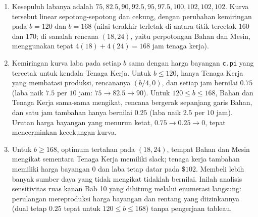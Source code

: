 \begin{enumerate}
\item Kesepuluh labanya adalah
$75, 82.5, 90, 92.5, 95, 97.5, 100, 102, 102, 102$. Kurva tersebut linear
sepotong-sepotong dan cekung, dengan perubahan kemiringan pada $b = 120$ dan
$b = 168$ (nilai terakhir terletak di antara titik tercetak $160$ dan $170$;
di sanalah rencana $(18,24)$, yaitu perpotongan Bahan dan Mesin, menggunakan
tepat $4(18) + 4(24) = 168$ jam tenaga kerja).
\item Kemiringan kurva laba pada setiap $b$ sama dengan harga bayangan
\texttt{c.pi} yang tercetak untuk kendala Tenaga Kerja. Untuk $b \leq 120$,
hanya Tenaga Kerja yang membatasi produksi, rencananya $(b/4, 0)$, dan setiap
jam bernilai $0.75$ (laba naik $7.5$ per $10$ jam:
$75 \to 82.5 \to 90$). Untuk $120 \leq b \leq 168$, Bahan dan Tenaga Kerja
sama-sama mengikat, rencana bergerak sepanjang garis Bahan, dan satu jam
tambahan hanya bernilai $0.25$ (laba naik $2.5$ per $10$ jam). Urutan harga
bayangan yang menurun ketat, $0.75 \to 0.25 \to 0$, tepat mencerminkan
kecekungan kurva.
\item Untuk $b \geq 168$, optimum tertahan pada $(18, 24)$, tempat Bahan dan
Mesin mengikat sementara Tenaga Kerja memiliki slack; tenaga kerja tambahan
memiliki harga bayangan $0$ dan laba tetap datar pada $\$102$. Membeli lebih
banyak sumber daya yang tidak mengikat tidaklah bernilai. Inilah analisis
sensitivitas ruas kanan Bab 10 yang dihitung melalui enumerasi langsung: perulangan
mereproduksi harga bayangan dan rentang yang diizinkannya (dual tetap $0.25$
tepat untuk $120 \leq b \leq 168$) tanpa pengerjaan tableau.
\end{enumerate}
